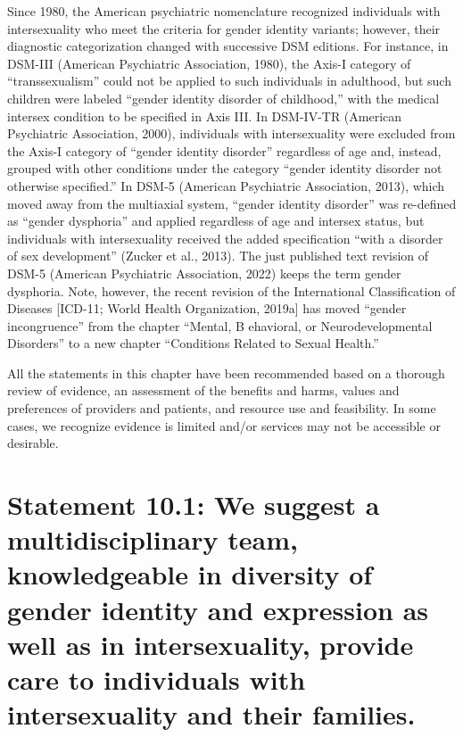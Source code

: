 \documentclass[
]{book}
\begin{document}
Since 1980, the American psychiatric nomenclature recognized individuals with intersexuality
who meet the criteria for gender identity variants;
however, their diagnostic categorization changed
with successive DSM editions. For instance, in
DSM-III (American Psychiatric Association,
1980), the Axis-I category of ``transsexualism''
could not be applied to such individuals in adulthood, but such children were labeled ``gender
identity disorder of childhood,'' with the medical
intersex condition to be specified in Axis III. In
DSM-IV-TR (American Psychiatric Association,
2000), individuals with intersexuality were
excluded from the Axis-I category of ``gender
identity disorder'' regardless of age and, instead,
grouped with other conditions under the category
``gender identity disorder not otherwise specified.''
In DSM-5 (American Psychiatric Association,
2013), which moved away from the multiaxial
system, ``gender identity disorder'' was re-defined
as ``gender dysphoria'' and applied regardless of
age and intersex status, but individuals with intersexuality received the added specification ``with
a disorder of sex development'' (Zucker et al.,
2013). The just published text revision of DSM-5
(American Psychiatric Association, 2022) keeps
the term gender dysphoria. Note, however, the
recent revision of the International Classification
of Diseases {[}ICD-11; World Health Organization,
2019a{]} has moved ``gender incongruence'' from
the chapter ``Mental, B ehavioral, or
Neurodevelopmental Disorders'' to a new chapter
``Conditions Related to Sexual Health.''

All the statements in this chapter have been
recommended based on a thorough review of
evidence, an assessment of the benefits and
harms, values and preferences of providers and
patients, and resource use and feasibility. In some
cases, we recognize evidence is limited and/or
services may not be accessible or desirable.

\hypertarget{statement-10.1-we-suggest-a-multidisciplinary-team-knowledgeable-in-diversity-of-gender-identity-and-expression-as-well-as-in-intersexuality-provide-care-to-individuals-with-intersexuality-and-their-families.}{%
\section*{Statement 10.1: We suggest a multidisciplinary team, knowledgeable in diversity of gender identity and expression as well as in intersexuality, provide care to individuals with intersexuality and their families.}\label{statement-10.1-we-suggest-a-multidisciplinary-team-knowledgeable-in-diversity-of-gender-identity-and-expression-as-well-as-in-intersexuality-provide-care-to-individuals-with-intersexuality-and-their-families.}}
\end{document}
